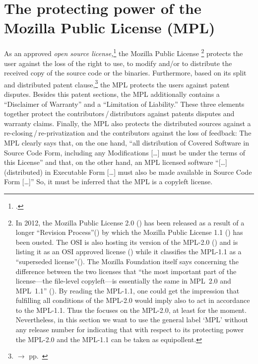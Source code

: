 \section{\texorpdfstring{The protecting power of the}{The} Mozilla Public License (MPL)}
 
As an approved \emph{open source license,}\footcite[cf.][\nopage wp]{OSI2012b}
the Mozilla Public License%
  \footnote{In 2012, the Mozilla Public License 2.0 
  (\cite[cf.][\nopage wp]{Mpl20MozFoundation2012a}) has been released as a
  result of a longer \enquote{Revision Process}(\cite[cf.][\nopage
  wp]{Mpl11To20MozFoundation2013a}) by which the  Mozilla Public License 1.1 
  (\cite[cf.][\nopage wp]{Mpl11MozFoundation2013a}) has been ousted. The OSI is 
  also hosting its version of the MPL-2.0 (\cite[cf.][\nopage
  wp]{Mpl20OsiLicense2013a}) and is listing it as an OSI approved license 
  (\cite[cf.][\nopage wp]{OSI2012b}) while it classifies the MPL-1.1 as a
  \enquote{superseded license}(\cite[cf.][\nopage wp]{OSI2013b}). The Mozilla
  Foundation itself says concerning the difference between the two licenses that 
  \enquote{the most important part of the license---the file-level copyleft---is
  essentially the same in MPL~2.0 and MPL~1.1} (\cite[cf.][\nopage
  wp]{Mpl11To20MozFoundation2013a}). By reading the MPL-1.1, one could get the
  impression that fulfilling all conditions of the MPL-2.0 would imply also to act
  in accordance to the MPL-1.1. Thus the \oslic{} focuses on the MPL-2.0, at least
  for the moment. Nevertheless, in this section we want to use the general label
  `MPL' without any release number for indicating that with respect to its
  protecting power the MPL-2.0 and the MPL-1.1 can be taken as equipollent.}
protects the user against the loss of the right to use, to modify and/or to
distribute the received copy of the source code or the
binaries.  Furthermore, based on its split and distributed patent
clause,\footnote{$\rightarrow$ \oslic{} pp.\ } the
MPL protects the users against patent disputes.
Besides this patent sections, the MPL additionally contains a
\enquote{Disclaimer of Warranty} and a \enquote{Limitation of
Liability.} These three elements together protect the
contributors\,/\,distributors against patents disputes and warranty claims.
Finally, the MPL also protects the distributed sources against a
re-closing\,/\,re-privatization and the contributors against the loss of
feedback: The MPL clearly says that, on the one hand, \enquote{all distribution
of Covered Software in Source Code Form, including any Modifications [\ldots]
must be under the terms of this License} and that, on the other
hand, an MPL licensed software \enquote{[\ldots] (distributed) in Executable
Form [\ldots] must also be made available in Source Code Form
[\ldots]} So, it must be inferred that the MPL is a copyleft
license. 

